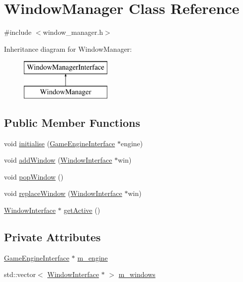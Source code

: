 \hypertarget{classWindowManager}{\section{Window\-Manager Class Reference}
\label{classWindowManager}
}


{\ttfamily \#include $<$window\-\_\-manager.\-h$>$}

Inheritance diagram for Window\-Manager\-:\begin{figure}[H]
\begin{center}
\leavevmode
\includegraphics[height=2.000000cm]{classWindowManager}
\end{center}
\end{figure}
\subsection*{Public Member Functions}
\begin{DoxyCompactItemize}
\item 
void \hyperlink{classWindowManager_a8a4daf5be17d22415df9b5c9a577ebe0}{initialise} (\hyperlink{classGameEngineInterface}{Game\-Engine\-Interface} $\ast$engine)
\item 
void \hyperlink{classWindowManager_a1686c44231c43bff5c8b262d2f0b7c86}{add\-Window} (\hyperlink{classWindowInterface}{Window\-Interface} $\ast$win)
\item 
void \hyperlink{classWindowManager_a42dae7b3b11730f2a4fe629cdc22ee6d}{pop\-Window} ()
\item 
void \hyperlink{classWindowManager_af5e3a6217eaba1bbbf4b7f1d45707467}{replace\-Window} (\hyperlink{classWindowInterface}{Window\-Interface} $\ast$win)
\item 
\hyperlink{classWindowInterface}{Window\-Interface} $\ast$ \hyperlink{classWindowManager_aa6e650ff5d24dab3930abb578a3a3e63}{get\-Active} ()
\end{DoxyCompactItemize}
\subsection*{Private Attributes}
\begin{DoxyCompactItemize}
\item 
\hyperlink{classGameEngineInterface}{Game\-Engine\-Interface} $\ast$ \hyperlink{classWindowManager_ae1fb8500f2391518ba8c7b2cfb6f30f7}{m\-\_\-engine}
\item 
std\-::vector$<$ \hyperlink{classWindowInterface}{Window\-Interface} $\ast$ $>$ \hyperlink{classWindowManager_ad3b8bc0fa911812f00a871c195944c65}{m\-\_\-windows}
\end{DoxyCompactItemize}


